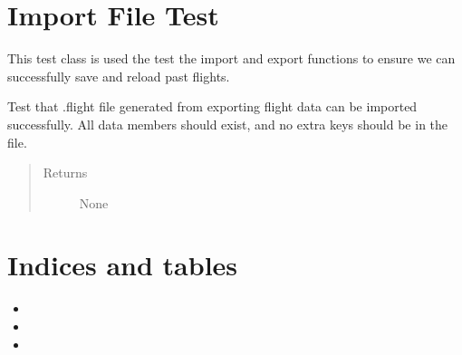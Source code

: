 \documentclass[letterpaper,10pt,english]{sphinxmanual}
\begin{document}
\chapter{Import File Test}
\label{\detokenize{index:module-src.Tests.ImportFile_Test}}\label{\detokenize{index:import-file-test}}

\begin{fulllineitems}
\label{\detokenize{index:src.Tests.ImportFile_Test.ImportFileTests}}
This test class is used the test the import and export functions to ensure we can successfully
save and reload past flights.

\begin{fulllineitems}
\label{\detokenize{index:src.Tests.ImportFile_Test.ImportFileTests.test_import}}
Test that .flight file generated from exporting flight data can be imported successfully.
All data members should exist, and no extra keys should be in the file.
\begin{quote}\begin{description}
\item[{Returns}] \leavevmode
None

\end{description}\end{quote}

\end{fulllineitems}


\end{fulllineitems}



\chapter{Indices and tables}
\label{\detokenize{index:indices-and-tables}}\begin{itemize}
\item {} 

\item {} 

\item {} 

\end{itemize}
\end{document}

